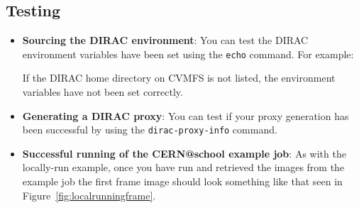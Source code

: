 \subsection{Testing}
\label{moving-the-example-workflow-to-the-grid---testing}

\begin{itemize}
\item
  \textbf{Sourcing the DIRAC environment}: You can test the DIRAC
  environment variables have been set using the \texttt{echo} command.
  For example:

\begin{Shaded}
\begin{Highlighting}[]
\NormalTok{$ } 
\end{Highlighting}
\end{Shaded}

  If the DIRAC home directory on CVMFS is not listed, the environment
  variables have not been set correctly.
\item
  \textbf{Generating a DIRAC proxy}: You can test if your proxy
  generation has been successful by using the \texttt{dirac-proxy-info}
  command.
\item
  \textbf{Successful running of the CERN@school example job}: As with
  the locally-run example, once you have run and retrieved the images
  from the example job the first frame image should look something like
  that seen in Figure~\ref{fig:localrunningframe}.
\end{itemize}
